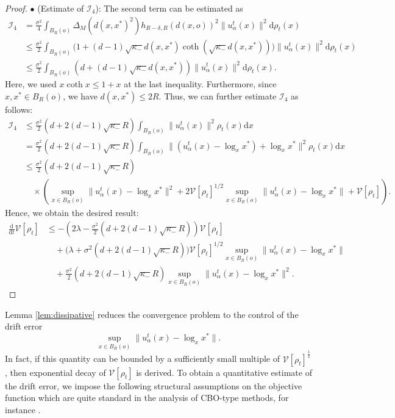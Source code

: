 \documentclass[11pt]{amsart}
\def\d{\mathrm{d}}
\newcommand{\dm}{d} %
\newcommand{\p}{o}%
\newcommand{\dist}{d}%
\begin{document}
\begin{proof}
\noindent $\bullet$ (Estimate of $\mathcal I_4$): The second term can be estimated as
\begin{align*}
\mathcal{I}_4&=\frac{\sigma^2}{4}\int_{B_R(\p)} \Delta_M\left(\dist(x, x^*)^2\right)h_{R-\delta, R}\left(\dist(x, \p)\right)^2 \|u_\alpha^t(x)\|^2 \d\rho_t(x)\\
&\leq \frac{\sigma^2}{2}\int_{B_R(\p)} \bigg(1+(\dm-1)\sqrt{\kappa_-}\dist(x, x^*)\coth\left(\sqrt{\kappa_-}\dist(x, x^*)\right)\bigg)\|u_\alpha^t(x)\|^2\d\rho_t(x)\\
&\leq \frac{\sigma^2}{2}\int_{B_R(\p)}\left(\dm+(\dm-1)\sqrt{\kappa_-}\dist(x, x^*)\right)\|u_\alpha^t(x)\|^2 \d\rho_t(x).
\end{align*}
Here, we used $x\coth x\leq 1+x$ at the last inequality. Furthermore,  since $x, x^*\in {B_R(\p)}$, we have  $\dist(x, x^*)\leq 2R$. Thus, we can further estimate $\mathcal{I}_4$ as follows:
\begin{align*}
\mathcal{I}_4& \leq\frac{\sigma^2}{2} (\dm+2(d-1)\sqrt{\kappa_-}R) \int_{B_R(\p)}\|u_\alpha^t(x)\|^2 \rho_t(x) \d x \\
& = \frac{\sigma^2}{2} (\dm+2(d-1)\sqrt{\kappa_-}R) \int_{B_R(\p)}\|(u_\alpha^t(x)-\log_xx^*)+\log_xx^*\|^2\rho_t(x)\d x \\
& \leq  \frac{\sigma^2}{2} (\dm+2(d-1)\sqrt{\kappa_-}R) \\
&\quad \times \left(\sup_{x\in B_R(\p)}\|u_\alpha^t(x)-\log_xx^*\|^2+2\mathcal{V}[\rho_t]^{1/2}\sup_{x\in B_R(\p)}\|u_\alpha^t(x)-\log_xx^*\|+\mathcal{V}[\rho_t]\right).
\end{align*}
Hence, we obtain the desired result:
\begin{align*}
\frac{\d}{\d t}\mathcal{V}[\rho_t] &\leq -\left(2\lambda -   \frac{\sigma^2}{2} (\dm+2(d-1)\sqrt{\kappa_-}R) \right)\mathcal{V}[\rho_t]  \\
&\quad +\Big(  \lambda + \sigma^2 (\dm+2(d-1)\sqrt{\kappa_-}R)\Big)  \mathcal{V}[\rho_t]^{1/2}\sup_{x\in B_R(\p)}\|u_\alpha^t(x)-\log_xx^*\| \\
&\quad +  \frac{\sigma^2}{2} (\dm+2(d-1)\sqrt{
\kappa_-}R) \sup_{x\in B_R(\p)}\|u_\alpha^t(x)-\log_xx^*\|^2.
\end{align*}

\end{proof}

Lemma \ref{lem:dissipative} reduces the convergence problem to the control of the drift error
\[
\sup_{x\in B_R(o)}\|u_\alpha^t(x)-\log_xx^*\|.
\]
In fact, if this quantity can be bounded by a sufficiently small multiple of $\mathcal V[\rho_t]^\frac12$, then exponential decay of $\mathcal V[\rho_t]$ is derived. 
To obtain a quantitative estimate of the drift error, we impose the following structural assumptions on the objective function which are quite standard in the analysis of   CBO-type methods, for instance \cite{carrillo2018analytical,fornasier2024consensus}.\\
\end{document}
